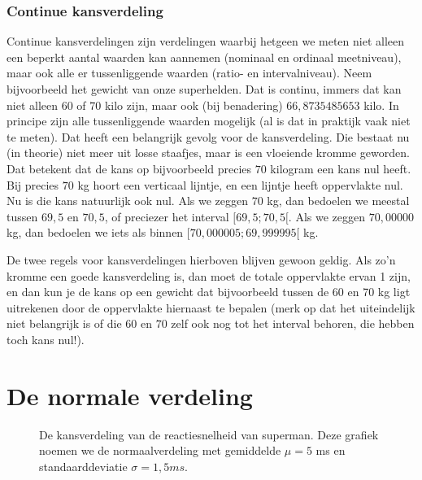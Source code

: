 \subsubsection{Continue kansverdeling}

Continue kansverdelingen zijn verdelingen waarbij hetgeen we meten niet alleen een beperkt aantal waarden kan aannemen (nominaal en ordinaal meetniveau), maar ook alle er tussenliggende waarden (ratio- en intervalniveau). Neem bijvoorbeeld het gewicht van onze superhelden. Dat is continu, immers dat kan niet alleen $60$ of $70$ kilo zijn, maar ook (bij benadering)  $66,8735485653$ kilo. In principe zijn alle tussenliggende waarden mogelijk (al is dat in praktijk vaak niet te meten). Dat heeft een belangrijk gevolg voor de kansverdeling. Die bestaat nu (in theorie) niet meer uit losse staafjes, maar is een vloeiende kromme geworden. Dat betekent dat de kans op bijvoorbeeld precies $70$ kilogram een kans nul heeft. Bij precies $70$ kg hoort een verticaal lijntje, en een lijntje heeft oppervlakte nul. Nu is die kans natuurlijk ook nul. Als we zeggen $70$ kg, dan bedoelen we meestal tussen $69,5$ en $70,5$, of preciezer het interval $[69,5; 70,5[$. Als we zeggen $70,00000$ kg, dan bedoelen we iets als binnen $[70,000005; 69,999995[$ kg.

De twee regels voor kansverdelingen hierboven blijven gewoon geldig. Als zo'n kromme een goede kansverdeling is, dan moet de totale oppervlakte ervan 1 zijn, en dan kun je de kans op een gewicht dat bijvoorbeeld tussen de 60 en 70 kg ligt uitrekenen door de oppervlakte hiernaast te bepalen (merk op dat het uiteindelijk niet belangrijk is of die $60$ en $70$ zelf ook nog tot het interval behoren, die hebben toch kans nul!).

\section{De normale verdeling}
\label{sec:normale-verdeling}

\begin{figure}[t]
\centering
{}
\caption{De kansverdeling van de reactiesnelheid van superman. Deze grafiek noemen we de normaalverdeling met gemiddelde $\mu = 5$ ms en standaarddeviatie $\sigma = 1,5 ms.$}
\label{fig:verdelingReactievermogen}
\end{figure}


